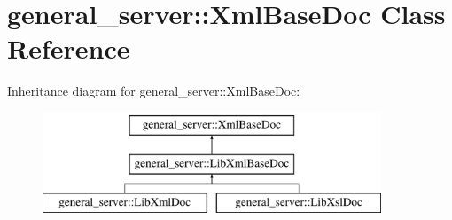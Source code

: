 \hypertarget{classgeneral__server_1_1XmlBaseDoc}{\section{general\-\_\-server\-:\-:\-Xml\-Base\-Doc \-Class \-Reference}
\label{classgeneral__server_1_1XmlBaseDoc}
}
\-Inheritance diagram for general\-\_\-server\-:\-:\-Xml\-Base\-Doc\-:\begin{figure}[H]
\begin{center}
\leavevmode
\includegraphics[height=3.000000cm]{classgeneral__server_1_1XmlBaseDoc}
\end{center}
\end{figure}
